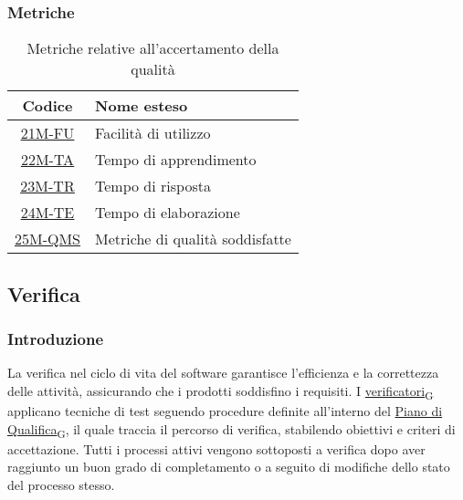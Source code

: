 \newpage

\subsubsection{Metriche}
\begin{table}[!h]
	\centering
	\begin{tabular}{ | c | l | }
		\hline
		\textbf{Codice}                      & \textbf{Nome esteso}            \\
		\hline
		\underline{\hyperlink{21M}{21M-FU}}  & Facilità di utilizzo            \\
        \underline{\hyperlink{22M}{22M-TA}}  & Tempo di apprendimento          \\
        \underline{\hyperlink{23M}{23M-TR}}  & Tempo di risposta               \\
        \underline{\hyperlink{24M}{24M-TE}}  & Tempo di elaborazione           \\
        \underline{\hyperlink{25M}{25M-QMS}} & Metriche di qualità soddisfatte \\
		\hline
	\end{tabular}
	\caption{Metriche relative all'accertamento della qualità}
\end{table}

\subsection{Verifica}
\subsubsection{Introduzione}
La verifica nel ciclo di vita del software garantisce l'efficienza e la correttezza delle attività, assicurando che i prodotti soddisfino i requisiti. I \href{https://7last.github.io/docs/rtb/documentazione-interna/glossario\#verificatore}{verificatori\textsubscript{G}} applicano tecniche di test seguendo procedure definite all'interno del \href{https://7last.github.io/docs/rtb/documentazione-interna/glossario\#piano-di-qualifica}{Piano di Qualifica\textsubscript{G}}, il quale traccia il percorso di verifica, stabilendo obiettivi e criteri di accettazione. Tutti i processi attivi vengono sottoposti a verifica dopo aver raggiunto un buon grado di completamento o a seguito di modifiche dello stato del processo stesso.

